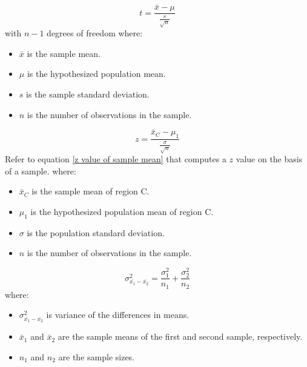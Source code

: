 \begin{equation}
\label{testing a mean sigma unknown}
t = \frac{\bar{x}-\mu}{\frac{s}{\sqrt{n}}}
\end{equation}
with $n-1$ degrees of freedom where: 
\begin{itemize}
 \item $\bar{x}$ is the sample mean.
 \item $\mu$ is the hypothesized population mean.
 \item $s$ is the sample standard deviation.
 \item $n$ is the number of observations in the sample.
\end{itemize}
\hformbar


\begin{equation}
\label{type II error}
z = \frac{\bar{x}_{C}-\mu_{1}}{\frac{\sigma}{\sqrt{n}}}
\end{equation}
Refer to equation \eqref{z value of sample mean} that computes a $z$ value on the basis of a sample.\newline
where: 
\begin{itemize}
 \item $\bar{x}_{C}$ is the sample mean of region C.
 \item $\mu_{1}$ is the hypothesized population mean of region C.
 \item $\sigma$ is the population standard deviation.
 \item $n$ is the number of observations in the sample.
\end{itemize}
\hformbar


\begin{equation}
\label{variance of the distribution of differences in means}
\sigma^{2}_{\bar{x_{1}}-\bar{x_{2}}} = \frac{\sigma^{2}_{1}}{n_{1}} + \frac{\sigma^{2}_{2}}{n_{2}}
\end{equation}
where:
\begin{itemize}
 \item $\sigma^{2}_{\bar{x_{1}}-\bar{x_{2}}}$ is variance of the differences in means.
 \item $\bar{x}_{1}$ and $\bar{x}_{2}$ are the sample means of the first and second sample, respectively.
 \item $n_{1}$ and $n_{2}$ are the sample sizes.
\end{itemize}
\hformbar


